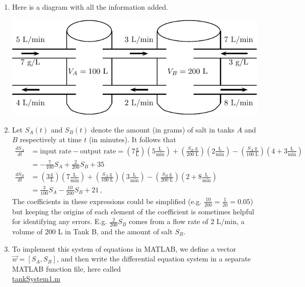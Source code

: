 \begin{enumerate}[1.]
\begin{Solution}
  \begin{enumerate}
  \item Here is a diagram with all the information added.
\begin{center}
\includegraphics[width=0.6\linewidth]{graphics/Week09_TankSystems/TankDiagram1}
\end{center}
\item   Let $S_A(t)$ and $S_B(t)$ denote the amount (in grams) of salt in tanks $A$
  and $B$ respectively at time $t$ (in minutes).  It follows that
  \begin{align*}
    \frac{dS_A}{dt} &= \text{input rate} - \text{output rate} = \left( 7
      \frac{\text{g}}{\text{L}} \right) \left( 5 \frac{\text{L}}{\text{min}}
    \right) + \left( \frac{S_B \; \text{g}}{200 \; \text{L}} \right) \left( 2
      \tfrac{\text{L}}{\text{min}} \right) - \left( \frac{S_A \; \text{g}}{100
        \; \text{L}} \right) \left( 4 + 3 \frac{\text{L}}{\text{min}} \right) \\
    &= - \frac{7}{100} S_A + \frac{2}{200} S_B + 35 \\
    \frac{dS_B}{dt} &= \left( 3 \frac{\text{g}}{\text{L}} \right) \left( 7
      \frac{\text{L}}{\text{min}} \right) + \left( \frac{S_A \; \text{g}}{100 \;
        \text{L}} \right) \left( 3 \frac{\text{L}}{\text{min}} \right) - \left(
      \frac{S_B \; \text{g}}{200 \; \text{L}} \right) \left( 2+8
      \tfrac{\text{L}}{\text{min}} \right) \\
    &=  \frac{3}{100} S_A - \frac{10}{200} S_B + 21 \, ,
  \end{align*}
  The coefficients in these expressions could be simplified
  (e.g. $\frac{10}{200} = \frac{1}{20} = 0.05$) but keeping the
  origins of each element of the coefficient is sometimes helpful for
  identifying any errors.  E.g. $\frac{2}{200}S_B$ comes from a flow
  rate of $2$ L/min, a volume of 200 L in Tank B, and the amount of
  salt $S_B$.

\item To implement this system of equations in MATLAB, we define a
  vector $\vec{w} = [S_A, S_B]$, and then write the differential
  equation system in a separate MATLAB function file, here called \\
\href{http://www.mast.queensu.ca/~apsc171/MNTCP01/PracticeProblems/MATLAB/tankSystem1.m}{tankSystem1.m} 


\end{enumerate}
\end{Solution}
\end{enumerate}
